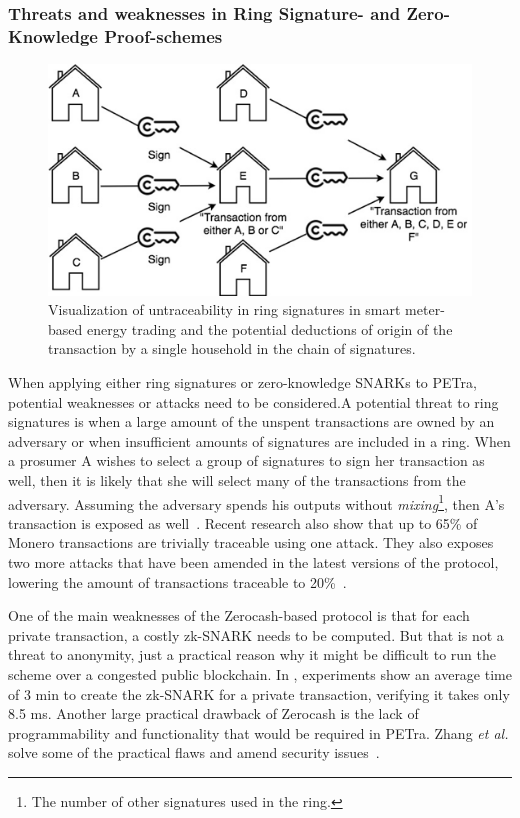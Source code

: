 \subsubsection{Threats and weaknesses in Ring Signature- and Zero-Knowledge Proof-schemes}
\label{transthreat} 
\begin{figure}[t]
\centering
\includegraphics[width=\columnwidth]{ringsigs.png}
\caption{Visualization of untraceability in ring signatures in smart meter-based energy trading and the potential deductions of origin of the transaction by a single household in the chain of signatures.}\label{fig:ringsigs}
\end{figure}
When applying either ring signatures or zero-knowledge SNARKs to PETra, potential weaknesses or attacks need to be considered.A potential threat to ring signatures is when a large amount of the unspent transactions are owned by an adversary or when insufficient amounts of signatures are included in a ring. When a prosumer A wishes to select a group of signatures to sign her transaction as well, then it is likely that she will select many of the transactions from the adversary. Assuming the adversary spends his outputs without \textit{mixing}\footnote{The number of other signatures used in the ring.}, then A's transaction is exposed as well~\cite{monero2014}. Recent research  also show that up to 65\% of Monero transactions are trivially traceable using one attack. They also exposes two more attacks that have been amended in the latest versions of the protocol, lowering the amount of transactions traceable to 20\%~\cite{monero2014,DBLP:journals/corr/MillerMLN17}.

One of the main weaknesses of the Zerocash-based protocol is that for each private transaction, a costly zk-SNARK needs to be computed. But that is not a threat to anonymity, just a practical reason why it might be difficult to run the scheme over a congested public blockchain. In \cite{Sasson:2014:ZDA:2650286.2650810}, experiments show an average time of 3 min to create the zk-SNARK for a private transaction, verifying it takes only 8.5 ms. Another large practical drawback of Zerocash is the lack of programmability and functionality that would be required in PETra. Zhang \textit{et al.} solve some of the practical flaws and amend security issues~\cite{zhangz}.

